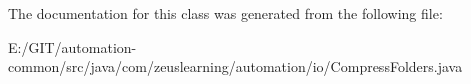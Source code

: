 The documentation for this class was generated from the following file\+:\begin{DoxyCompactItemize}
\item 
E\+:/\+G\+I\+T/automation-\/common/src/java/com/zeuslearning/automation/io/Compress\+Folders.\+java\end{DoxyCompactItemize}

